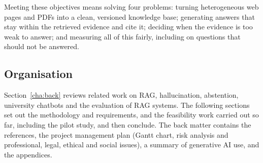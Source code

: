 Meeting these objectives means solving four problems: turning heterogeneous web pages and PDFs into a clean, versioned knowledge base; generating answers that stay within the retrieved evidence and cite it; deciding when the evidence is too weak to answer; and measuring all of this fairly, including on questions that should not be answered.

\subsection{Organisation} \label{sec:intro_orga}

Section~\ref{cha:back} reviews related work on RAG, hallucination, abstention, university chatbots and the evaluation of RAG systems. The following sections set out the methodology and requirements, and the feasibility work carried out so far, including the pilot study, and then conclude. The back matter contains the references, the project management plan (Gantt chart, risk analysis and professional, legal, ethical and social issues), a summary of generative AI use, and the appendices.
